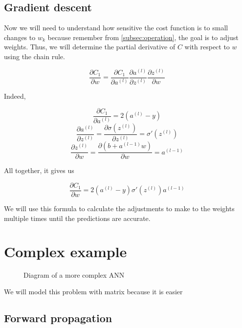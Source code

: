 \documentclass[]{report}
\begin{document}
\subsection{Gradient descent}

{Now we will need to understand how sensitive the cost function is to small changes to $w_k$ because remember from \ref{subsec:operation}, the goal is to adjust weights. Thus, we will determine the partial derivative of $C$ with respect to $w$ using the chain rule.}

\[{\frac{\partial C_1}{\partial w}=\frac{\partial C_1}{\partial a^{(l)}} \frac{\partial a^{(l)}}{\partial z^{(l)}} \frac{\partial  z^{(l)}}{\partial w}}\]

{Indeed,}

\[\frac{\partial C_1}{\partial a^{(l)}}=2\left(a^{(l)}-y\right)\]
\[\frac{\partial a^{(l)}}{\partial z^{(l)}}=\frac{\partial \sigma\left(z^{(l)}\right)}{\partial z^{(l)}}=\sigma\prime\left(z^{(l)}\right)\]
\[\frac{\partial  z^{(l)}}{\partial w}=\frac{\partial  \left(b+a^{(l-1)}w\right)}{\partial w}=a^{(l-1)}\]

{All together, it gives us}

\[\frac{\partial C_1}{\partial w}=2\left(a^{(l)}-y\right) \sigma\prime\left(z^{(l)}\right) a^{(l-1)}\]

{We will use this formula to calculate the adjustments to make to the weights multiple times until the predictions are accurate.}

\section{Complex example}

\begin{figure}[H]
    \centering
    \begin{neuralnetwork}[height=4, nodespacing=15mm]
        \newcommand{\inputtext}[2]{$a^{(l-1)}_#2$}
        \newcommand{\outputtext}[2]{$a^{(l)}_#2$}
        \inputlayer[count=3, bias=false, text=\inputtext, title=Input layer $a^{(l-1)}_k$]
        \outputlayer[count=2,  text=\outputtext, title=Output layer $a^{(l)}_j$]
        \linklayers[title=Weight $w_{jk}$]
    \end{neuralnetwork}
    \caption{Diagram of a more complex ANN}
\end{figure}

{We will model this problem with matrix because it is easier}

\subsection{Forward propagation}
\end{document}
